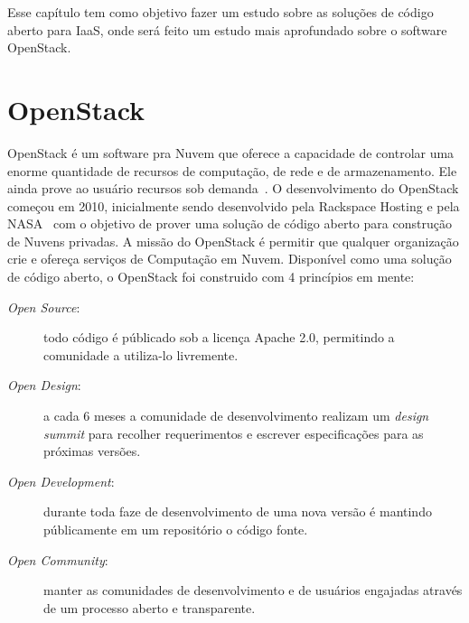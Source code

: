 Esse capítulo tem como objetivo fazer um estudo sobre as soluções de código aberto para IaaS, onde será feito um estudo mais aprofundado sobre o software OpenStack.

\section{OpenStack}

OpenStack é um software pra Nuvem que oferece a capacidade de controlar uma enorme quantidade de recursos de computação, de rede e de armazenamento. Ele ainda prove ao usuário recursos sob demanda~\cite{OpenStackIntro:Online}. O desenvolvimento do OpenStack começou em 2010, inicialmente sendo desenvolvido pela Rackspace Hosting e pela NASA~\cite{OpenStack:Online} com o objetivo de prover uma solução de código aberto para construção de Nuvens privadas. A missão do OpenStack é permitir que qualquer organização crie e ofereça serviços de Computação em Nuvem. Disponível como uma solução de código aberto, o OpenStack foi construido com 4 princípios em mente:

\begin{description}

	\item[\textit{Open Source}:] todo código é públicado sob a licença Apache 2.0, permitindo a comunidade a utiliza-lo livremente.

	\item[\textit{Open Design}:] a cada 6 meses a comunidade de desenvolvimento realizam um \textit{design summit} para recolher requerimentos e escrever especificações para as próximas versões.

	\item[\textit{Open Development}:] durante toda faze de desenvolvimento de uma nova versão é mantindo públicamente em um repositório o código fonte.

	\item[\textit{Open Community}:] manter as comunidades  de desenvolvimento e de usuários engajadas através de um processo aberto e transparente.   

\end{description}

